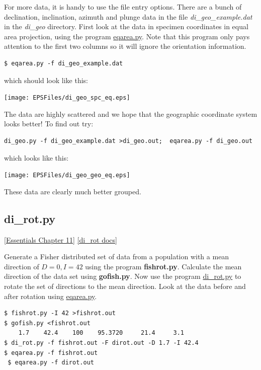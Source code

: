 \documentclass[11pt]{book}
\begin{document}
{{{For more data, it is handy to use the file entry options. There are a bunch of declination, inclination, azimuth and plunge data in the file {\it di\_geo\_example.dat} in the {\it di\_geo} directory.  First look at the data in specimen coordinates in equal area projection, using the program \href{#eqarea.py}{eqarea.py}.  Note that this program only pays attention to the first two columns so it will ignore the orientation information.

\begin{verbatim}
$ eqarea.py -f di_geo_example.dat
\end{verbatim}
which should look like this:

  \texttt{[image: EPSFiles/di\_geo\_spc\_eq.eps]}



The data are highly scattered and we hope that the geographic coordinate system looks better!  To find out try:
\begin{verbatim}
di_geo.py -f di_geo_example.dat >di_geo.out;  eqarea.py -f di_geo.out

\end{verbatim}

\noindent which looks like this:

  \texttt{[image: EPSFiles/di\_geo\_geo\_eq.eps]}

  \noindent These data are clearly much better grouped.



\subsection{di\_rot.py}
\href{http://earthref.org/MAGIC/books/Tauxe/Essentials/WebBook3ch11.html#ch11}{[Essentials Chapter  11]}
\href{https://github.com/PmagPy/PmagPy/blob/master/programs/di_rot.py}{[di\_rot docs]}


Generate a Fisher distributed set of data from a population with a mean direction of $D=0, I=42$ using the program {\bf fishrot.py}.  Calculate the mean direction of the data set using {\bf gofish.py}.  Now use the program \href{#di_rot.py}{di\_rot.py} to rotate the set of directions to the mean direction.  Look at the data before and after rotation using \href{#eqarea.py}{eqarea.py}.

\begin{verbatim}
$ fishrot.py -I 42 >fishrot.out
$ gofish.py <fishrot.out
    1.7    42.4    100    95.3720     21.4     3.1
$ di_rot.py -f fishrot.out -F dirot.out -D 1.7 -I 42.4
$ eqarea.py -f fishrot.out
 $ eqarea.py -f dirot.out
\end{verbatim}

}}}
\end{document}

